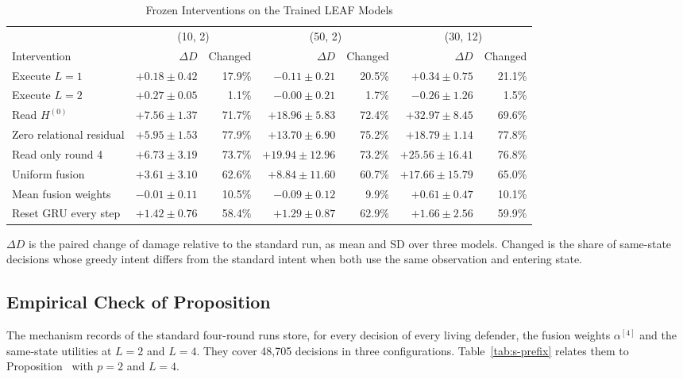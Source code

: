 \begin{table}[!t]
\centering
\scriptsize
\setlength{\tabcolsep}{4pt}
\caption{Frozen Interventions on the Trained LEAF Models}
\label{tab:s-interv}
\begin{tabular}{@{}lrrrrrr@{}}
\toprule
 & \multicolumn{2}{c}{(10, 2)} & \multicolumn{2}{c}{(50, 2)} & \multicolumn{2}{c}{(30, 12)}\\
\cmidrule(lr){2-3}\cmidrule(lr){4-5}\cmidrule(l){6-7}
Intervention & $\Delta D$ & Changed & $\Delta D$ & Changed & $\Delta D$ & Changed\\
\midrule
Execute $L=1$ & $+0.18\pm0.42$ & 17.9\% & $-0.11\pm0.21$ & 20.5\% & $+0.34\pm0.75$ & 21.1\%\\
Execute $L=2$ & $+0.27\pm0.05$ & 1.1\% & $-0.00\pm0.21$ & 1.7\% & $-0.26\pm1.26$ & 1.5\%\\
Read $H^{(0)}$ & $+7.56\pm1.37$ & 71.7\% & $+18.96\pm5.83$ & 72.4\% & $+32.97\pm8.45$ & 69.6\%\\
Zero relational residual & $+5.95\pm1.53$ & 77.9\% & $+13.70\pm6.90$ & 75.2\% & $+18.79\pm1.14$ & 77.8\%\\
Read only round 4 & $+6.73\pm3.19$ & 73.7\% & $+19.94\pm12.96$ & 73.2\% & $+25.56\pm16.41$ & 76.8\%\\
Uniform fusion & $+3.61\pm3.10$ & 62.6\% & $+8.84\pm11.60$ & 60.7\% & $+17.66\pm15.79$ & 65.0\%\\
Mean fusion weights & $-0.01\pm0.11$ & 10.5\% & $-0.09\pm0.12$ & 9.9\% & $+0.61\pm0.47$ & 10.1\%\\
Reset GRU every step & $+1.42\pm0.76$ & 58.4\% & $+1.29\pm0.87$ & 62.9\% & $+1.66\pm2.56$ & 59.9\%\\
\bottomrule
\end{tabular}
\par\smallskip
\parbox{\textwidth}{\scriptsize $\Delta D$ is the paired change of damage relative to the standard run, as mean and SD over three models. Changed is the share of same-state decisions whose greedy intent differs from the standard intent when both use the same observation and entering state.}
\end{table}

\subsection{\texorpdfstring{Empirical Check of Proposition~}{Empirical Check of Proposition 2}}
The mechanism records of the standard four-round runs store, for every decision of every living defender, the fusion weights $\alpha^{[4]}$ and the same-state utilities at $L=2$ and $L=4$. They cover 48,705 decisions in three configurations. Table~\ref{tab:s-prefix} relates them to Proposition~ with $p=2$ and $L=4$.


